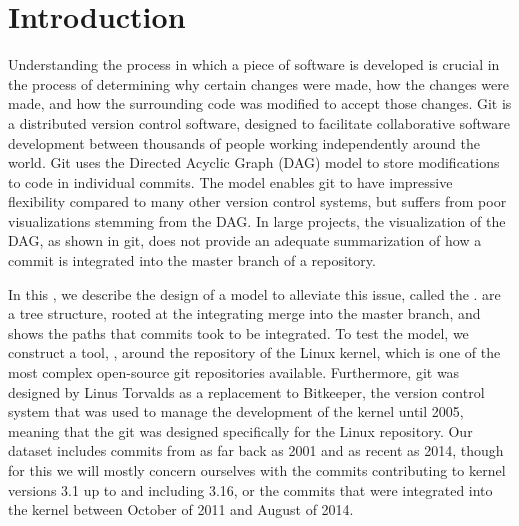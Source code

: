 \chapter{Introduction}

Understanding the process in which a piece of software is developed is
crucial in the process of determining why certain changes were made, how
the changes were made, and how the surrounding code was modified to
accept those changes. Git is a distributed version control software,
designed to facilitate collaborative software development between
thousands of people working independently around the world. Git uses the
Directed Acyclic Graph (DAG) model to store modifications to code in
individual commits. The model enables git to have impressive flexibility
compared to many other version control systems, but suffers from poor
visualizations stemming from the DAG. In large projects, the
visualization of the DAG, as shown in git, does not provide an adequate
summarization of how a commit is integrated into the master branch of a
repository.


In this \paper{} , we describe the
design of a model to alleviate this issue, called the \mt.  are a
tree structure, rooted at the integrating merge into the master branch,
and shows the paths that commits took to be integrated. To test the
model, we construct a tool, \tool, around the repository of the Linux
kernel, which is one of the most complex open-source git repositories
available. Furthermore, git was designed by Linus Torvalds as a
replacement to Bitkeeper, the version control system that was used to
manage the development of the kernel until 2005, meaning that the git
was designed specifically for the Linux repository. Our dataset includes
commits from as far back as 2001 and as recent as 2014, though for this
\paper{} we will mostly concern ourselves with the commits contributing
to kernel versions 3.1 up to and including 3.16, or the commits that
were integrated into the kernel between October of 2011 and August of
2014.
